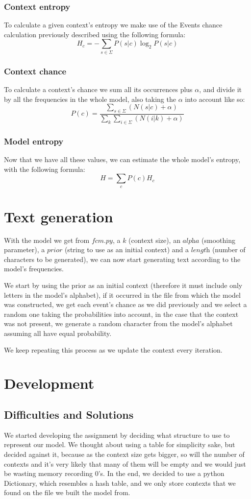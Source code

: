 \documentclass{article}
\begin{document}
	\subsubsection{Context entropy}
		To calculate a given context's entropy we make use of the Events chance calculation previously described using the following formula:
	\[H_c =-\sum_{s \in \Sigma}{ P(s|c)\log_2 P(s|c)}\] 
	\subsubsection{Context chance}
		To calculate a context's chance we sum all its occurrences plus $\alpha$, and divide it by all the frequencies in the whole model, also taking the $\alpha$ into account like so:
	\[P(c) =\frac{\displaystyle \sum_{s \in \Sigma}{(N(s|c) + \alpha)}}{\displaystyle \sum_{k}{{\sum_{i \in \Sigma}( N(i|k) + \alpha)}}}\]
	\subsubsection{Model entropy}
		Now that we have all these values, we can estimate the whole model's entropy, with the following formula:
	\[H = \sum_{c}P(c)H_c\]
	\section{Text generation}
	 With the model we get from $\textit{fcm.py}$, a $\textit{k}$ (context size), an $\textit{alpha}$ (smoothing parameter), a $\textit{prior}$ (string to use as an initial context) and a $\textit{length}$ (number of characters to be generated), we can now start generating text according to the model's frequencies.
		
		We start by using the prior as an initial context (therefore it must include only letters in the model's alphabet), if it occurred in the file from which the model was constructed, we get each event's chance as we did previously and we select a random one taking the probabilities into account, in the case that the context was not present, we generate a random character from the model's alphabet assuming all have equal probability.
		
		We keep repeating this process as we update the context every iteration.
	\section{Development}
	\subsection{Difficulties and Solutions}
	We started developing the assignment by deciding what structure to use to represent our model. We thought about using a table for simplicity sake, but decided against it, because as the context size gets bigger, so will the number of contexts and it's very likely that many of them will be empty and we would just be wasting memory recording 0's. In the end, we decided to use a python Dictionary, which resembles a hash table, and we only store contexts that we found on the file we built the model from. 
	
\end{document}
